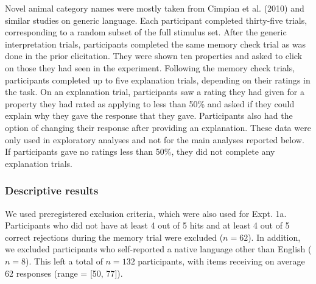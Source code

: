 \documentclass[floatsintext,doc]{apa6}
\begin{document}
Novel animal category names were mostly taken from Cimpian et al. (2010) and similar studies on generic language.
Each participant completed thirty-five trials, corresponding to a random subset of the full stimulus set.
After the generic interpretation trials, participants completed the same memory check trial as was done in the prior elicitation.
They were shown ten properties and asked to click on those they had seen in the experiment.
Following the memory check trials, participants completed up to five explanation trials, depending on their ratings in the task.
On an explanation trial, participants saw a rating they had given for a property they had rated as applying to less than 50\% and asked if they could explain why they gave the response that they gave.
Participants also had the option of changing their response after providing an explanation.
These data were only used in exploratory analyses and not for the main analyses reported below.
If participants gave no ratings less than 50\%, they did not complete any explanation trials.

\hypertarget{descriptive-results}{%
\subsubsection{Descriptive results}\label{descriptive-results}}

We used preregistered exclusion criteria, which were also used for Expt. 1a.
Participants who did not have at least 4 out of 5 hits and at least 4 out of 5 correct rejections during the memory trial were excluded (\(n = 62\)).
In addition, we excluded participants who self-reported a native language other than English (\(n = 8\)).
This left a total of \(n = 132\) participants, with items receiving on average 62 responses (range = {[}50, 77{]}).
\end{document}

